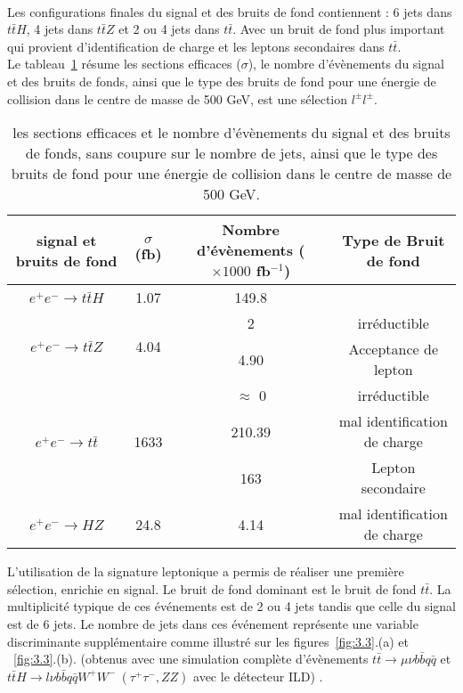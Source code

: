 ~\par Les configurations finales du signal et des bruits de fond contiennent : 6 jets dans $t\bar{t}H$, 4 jets dans $t\bar{t}Z$ et 2 ou 4 jets dans $t\bar{t}$. Avec un bruit de fond plus important qui provient d'identification de charge et les leptons secondaires dans $t\bar{t}$.\\

 Le tableau~\ref{table:3.2}  r\'esume les sections efficaces ($\sigma$), le nombre d'\'ev\`enements du signal et des bruits de fonds, ainsi que le type des bruits de fond pour une \'energie de collision dans le centre de masse de 500 GeV, est une sélection $l^{\pm}l^{\pm}$.
\begin{table}[H]
\centering
\begin{tabular}{|c|c|c|c|} \hline
  signal et bruits de fond & $\sigma$(fb) & Nombre d'\'ev\`enements ($\times 1000 $ fb$^{-1}$)  &  Type de Bruit de fond\\ \hline
  $e^+e^-{\rightarrow}t\bar{t}H$ & 1.07 & 149.8 &  \\ \hline
  \multirow{2}{*}{$e^+e^-{\rightarrow}t\bar{t}Z$} & \multirow{2}{*}{4.04} & \multirow{-1}{*}{2} & \multirow{-1}{*}{irréductible} \\ \cline{3-4}
  &  & 4.90 & Acceptance de lepton \\ \hline
  \multirow{3}{*}{$e^+e^-{\rightarrow}t\bar{t}$} & \multirow{3}{*}{1633} & \multirow{-1}{*}{$\approx$ 0} &  \multirow{-1}{*}{irréductible} \\ \cline{3-4}
  &  & 210.39 & mal identification de charge  \\ \cline{3-4}
  &  & 163 & Lepton secondaire  \\ \hline
  $e^+e^-{\rightarrow}HZ$ & 24.8 & 4.14 & mal identification de charge \\\hline
\end{tabular}
\caption{les sections efficaces et le nombre d'\'ev\`enements du signal et des
  bruits de fonds, sans coupure sur le nombre de jets, ainsi que le type des bruits de fond pour une \'energie de collision dans le centre de masse de 500 GeV.}
\label{table:3.2} 
\end{table}

L'utilisation de la signature leptonique a permis de r\'ealiser une premi\`ere s\'election, enrichie en signal. Le bruit de fond dominant est le bruit de fond $t\bar{t}$. La multiplicit\'e typique de ces \'ev\'enements est de 2 ou 4 jets tandis que celle du signal est de 6 jets. Le nombre de jets dans ces \'ev\'enement repr\'esente une variable discriminante suppl\'ementaire comme illustr\'e sur les figures~\ref{fig:3.3}.(a) et ~\ref{fig:3.3}.(b). (obtenus avec une simulation complète d'évènements $t\bar{t}{\rightarrow}\mu \nu b\bar{b} q\bar{q}$ et $t\bar{t}H{\rightarrow}l \nu b\bar{b} q\bar{q}W^+W^- \ (\tau^+\tau^-, ZZ)$ avec le détecteur ILD) .

